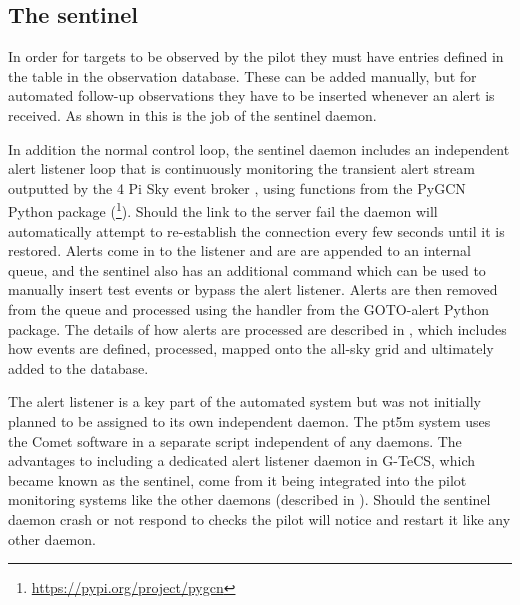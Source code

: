 \subsection{The sentinel}
\label{sec:sentinel}
\begin{colsection}

In order for targets to be observed by the pilot they must have entries defined in the  table in the observation database. These can be added manually, but for automated follow-up observations they have to be inserted whenever an alert is received. As shown in  this is the job of the sentinel daemon.

In addition the normal control loop, the sentinel daemon includes an independent alert listener loop that is continuously monitoring the transient alert stream outputted by the 4 Pi Sky event broker \citep{4pisky}, using functions from the PyGCN Python package (\footnote{\url{https://pypi.org/project/pygcn}}). Should the link to the server fail the daemon will automatically attempt to re-establish the connection every few seconds until it is restored. Alerts come in to the listener and are are appended to an internal queue, and the sentinel also has an additional  command which can be used to manually insert test events or bypass the alert listener. Alerts are then removed from the queue and processed using the handler from the GOTO-alert Python package. The details of how alerts are processed are described in , which includes how events are defined, processed, mapped onto the all-sky grid and ultimately added to the database.

The alert listener is a key part of the automated system but was not initially planned to be assigned to its own independent daemon. The pt5m system uses the Comet software \citep{comet} in a separate script independent of any daemons. The advantages to including a dedicated alert listener daemon in G-TeCS, which became known as the sentinel, come from it being integrated into the pilot monitoring systems like the other daemons (described in ). Should the sentinel daemon crash or not respond to checks the pilot will notice and restart it like any other daemon.

\end{colsection}


